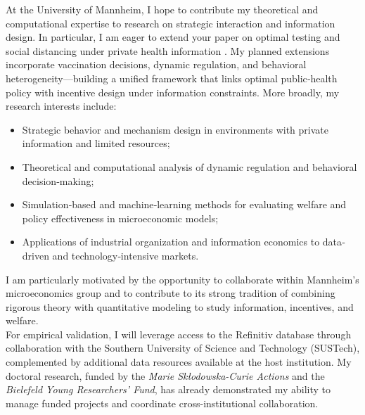 \documentclass{nfr}
\begin{document}
At the University of Mannheim, I hope to contribute my theoretical and computational expertise to research on strategic interaction and information design. In particular, I am eager to extend your paper on optimal testing and social distancing under private health information \citep{troger2025optimal}. My planned extensions incorporate vaccination decisions, dynamic regulation, and behavioral heterogeneity—building a unified framework that links optimal public‐health policy with incentive design under information constraints. 
More broadly, my research interests include:
\begin{itemize}
    \item Strategic behavior and mechanism design in environments with private information and limited resources;
    \item Theoretical and computational analysis of dynamic regulation and behavioral decision‐making;
    \item Simulation‐based and machine‐learning methods for evaluating welfare and policy effectiveness in microeconomic models;
    \item Applications of industrial organization and information economics to data‐driven and technology‐intensive markets.
\end{itemize}
I am particularly motivated by the opportunity to collaborate within Mannheim’s microeconomics group and to contribute to its strong tradition of combining rigorous theory with quantitative modeling to study information, incentives, and welfare.\\

For empirical validation, I will leverage access to the Refinitiv database through collaboration with the Southern University of Science and Technology (SUSTech), complemented by additional data resources available at the host institution. My doctoral research, funded by the \textit{Marie Skłodowska-Curie Actions} and the \textit{Bielefeld Young Researchers’ Fund}, has already demonstrated my ability to manage funded projects and coordinate cross-institutional collaboration. \\
\end{document}
